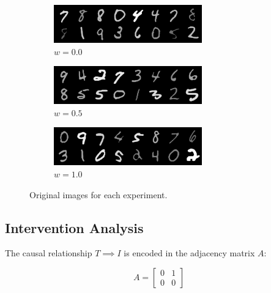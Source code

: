 \documentclass{article}
\begin{document}
	\begin{figure}[H]
		\centering
		\begin{subfigure}{0.3\textwidth}
			\centering
			\includegraphics[width=\textwidth]{images/original_0.0}
			\caption{$w = 0.0$}
			\label{fig:original_0.0}
		\end{subfigure} \hfill
		\begin{subfigure}{0.3\textwidth}
			\centering
			\includegraphics[width=\textwidth]{images/original_0.5}
			\caption{$w = 0.5$}
			\label{fig:original_0.5}
		\end{subfigure} \hfill
		\begin{subfigure}{0.3\textwidth}
			\centering
			\includegraphics[width=\textwidth]{images/original_1.0}
			\caption{$w = 1.0$}
			\label{fig:original_1.0}
		\end{subfigure}
		\caption{Original images for each experiment.}
		\label{fig:original_images}
	\end{figure}
	
	\subsection*{Intervention Analysis}
	
	The causal relationship $T \implies I$ is encoded in the adjacency matrix $A$:
	
	$$
	A = \begin{bmatrix}
		0 & 1 \\
		0 & 0 
	\end{bmatrix}
	$$
	
\end{document}
